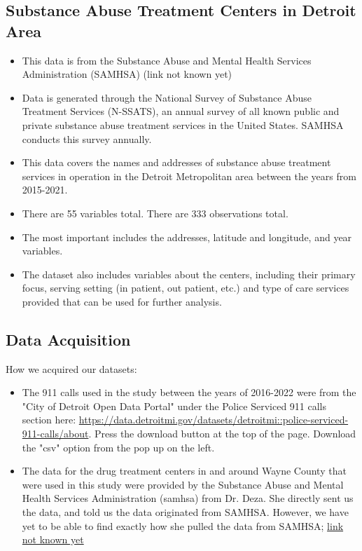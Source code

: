 \documentclass[12pt]{article}
\begin{document}
\subsection{Substance Abuse Treatment Centers in Detroit Area}
    \begin{itemize}
        \item This data is from the Substance Abuse and Mental Health Services Administration (SAMHSA) (link not known yet)
  \item Data is generated through the National Survey of Substance Abuse Treatment Services (N-SSATS), an annual survey of all known public and private substance abuse treatment services in the United States. SAMHSA conducts this survey annually.
  \item This data covers the names and addresses of substance abuse treatment services in operation in the Detroit Metropolitan area between the years from 2015-2021. 
  \item There are 55 variables total. There are 333 observations total. 
  \item The most important includes the addresses, latitude and longitude, and year variables. 
  \item   The dataset also includes variables about the centers, including their primary focus, serving setting (in patient, out patient, etc.) and type of care services provided that can be used for further analysis.
  \end{itemize}


\subsection{Data Acquisition}
\label{sec:theory}
How we acquired our datasets:
\begin{itemize}
    \item The 911 calls used in the study between the years of 2016-2022 were from the "City of Detroit Open Data Portal" under the Police Serviced 911 calls section here:
    \url{https://data.detroitmi.gov/datasets/detroitmi::police-serviced-911-calls/about}. Press the download button at the top of the page. Download the "csv" option from the pop up on the left.
    \item The data for the drug treatment centers in and around Wayne County that were used in this study were provided by the Substance Abuse and Mental Health Services Administration  (samhsa) from Dr. Deza. She directly sent us the data, and told us the data originated from SAMHSA. However, we have yet to be able to find exactly how she pulled the data from SAMHSA;
    \url{link not known yet}
\end{itemize}
\end{document}
